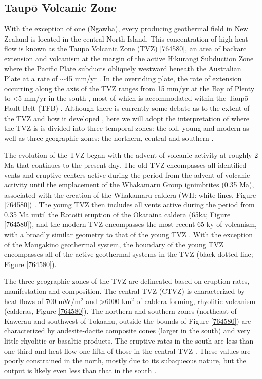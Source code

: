 \subsection{Taup\={o} Volcanic Zone}
With the exception of one (Ngawha), every producing geothermal field in New Zealand is located in the central North Island. This concentration of high heat flow is known as the Taup\={o} Volcanic Zone (TVZ) \ref{764580}, an area of backarc extension and volcanism at the margin of the active Hikurangi Subduction Zone where the Pacific Plate subducts obliquely westward beneath the Australian Plate at a rate of $\sim$45 mm/yr \citep{Cole_1981,Wilson_1995,DeMets_1994}. In the overriding plate, the rate of extension occurring along the axis of the TVZ ranges from 15 mm/yr at the Bay of Plenty to \textless 5 mm/yr in the south \cite{Wallace_2004}, most of which is accommodated within the Taup\={o} Fault Belt (TFB) \cite{Villamor_2011}. Although there is currently some debate as to the extent of the TVZ and how it developed \citep[e.g.][]{Stern_2011,Wilson_1995}, here we will adopt the interpretation of \citet{Wilson_2016} where the TVZ is is divided into three temporal zones: the old, young and modern as well as three geographic zones: the northern, central and southern \citep{Wilson_1995,Wilson_2016}.

The evolution of the TVZ began with the advent of volcanic activity at roughly 2 Ma that continues to the present day. The old TVZ encompasses all identified vents and eruptive centers active during the period from the advent of volcanic activity until the emplacement of the Whakamaru Group ignimbrites (0.35 Ma), associated with the creation of the Whakamaru caldera (WH: white lines, Figure \ref{764580}) \citep{Wilson_1995}. The young TVZ then includes all vents active during the period from 0.35 Ma until the Rotoiti eruption of the Okataina caldera (65ka; Figure \ref{764580}), and the modern TVZ encompasses the most recent 65 ky of volcanism, with a broadly similar geometry to that of the young TVZ \citep{Wilson_1995,Wilson_2016}. With the exception of the Mangakino geothermal system, the boundary of the young TVZ encompasses all of the active geothermal systems in the TVZ (black dotted line; Figure \ref{764580}).

The three geographic zones of the TVZ are delineated based on eruption rates, manifestation and composition. The central TVZ (CTVZ) is characterized by heat flows of 700 mW/m$^2$ \citep{Bibby_1995} and \textgreater6000 km$^2$ of caldera-forming, rhyolitic volcanism \citep{Wilson_1995} (calderas, Figure \ref{764580}). The northern and southern zones (northeast of Kawerau and southwest of Tokaanu, outside the bounds of Figure \ref{764580}) are characterized by andesite-dacite composite cones (larger in the south) and very little rhyolitic or basaltic products. The eruptive rates in the south are less than one third and heat flow one fifth of those in the central TVZ \citep{Wilson_2016}. These values are poorly constrained in the north, mostly due to its subaqueous nature, but the output is likely even less than that in the south \citep{Wilson_2016}.

